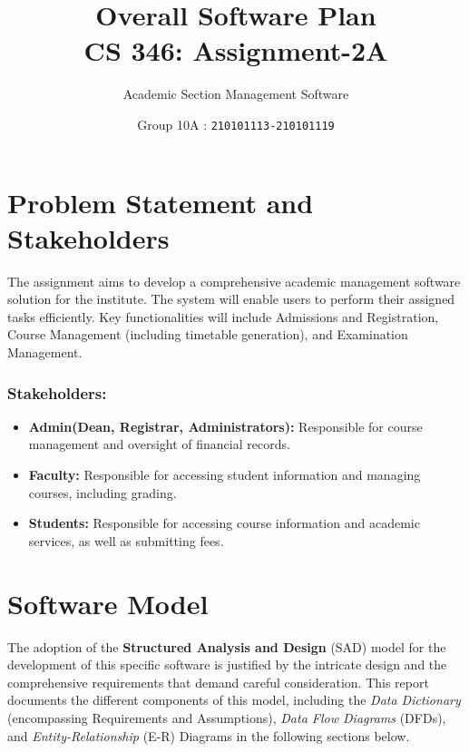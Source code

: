\documentclass[12pt,a4paper]{article}
\begin{document}
\title{\huge \textbf{Overall Software Plan} \\ \LARGE {\textbf{CS 346: Assignment-2A}}}
\author{\Large Academic Section Management Software}
\date{Group 10A : \texttt{210101113-210101119}}
\maketitle


\section{Problem Statement and Stakeholders}
The assignment aims to develop a comprehensive academic management software solution for the institute. The system will enable users to perform their assigned tasks efficiently. Key functionalities will include Admissions and Registration, Course Management (including timetable generation), and Examination Management.

\subsubsection*{Stakeholders:}
\begin{itemize}
    \item \textbf{Admin(Dean, Registrar, Administrators):} Responsible for course management and oversight of financial records.
    \item \textbf{Faculty:} Responsible for accessing student information and managing courses, including grading.
    \item \textbf{Students:} Responsible for accessing course information and academic services, as well as submitting fees.
\end{itemize}

\section{Software Model}
The adoption of the \textbf{Structured Analysis and Design} (SAD) model for the development of this specific software is justified by the intricate design and the comprehensive requirements that demand careful consideration. This report documents the different components of this model, including the \textit{Data Dictionary} (encompassing Requirements and Assumptions), \textit{Data Flow Diagrams} (DFDs), and \textit{Entity-Relationship} (E-R) Diagrams in the following sections below.
    
\end{document}
